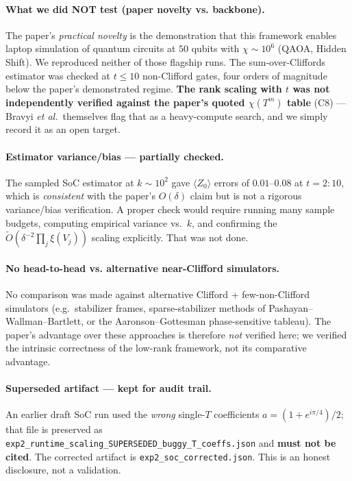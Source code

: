 \documentclass[11pt]{article}
\begin{document}
\paragraph{What we did NOT test (paper novelty vs. backbone).}
The paper's \emph{practical novelty} is the demonstration that this framework enables
laptop simulation of quantum circuits at $50$ qubits with $\chi \sim 10^6$ (QAOA,
Hidden Shift). We reproduced neither of those flagship runs. The sum-over-Cliffords
estimator was checked at $t \leq 10$ non-Clifford gates, four orders of magnitude below
the paper's demonstrated regime. \textbf{The rank scaling with $t$ was not
independently verified against the paper's quoted $\chi(T^m)$ table} (C8) --- Bravyi
\emph{et al.}\ themselves flag that as a heavy-compute search, and we simply record it
as an open target.

\paragraph{Estimator variance/bias --- partially checked.}
The sampled SoC estimator at $k \sim 10^2$ gave $\langle Z_0\rangle$ errors of $0.01$--$0.08$
at $t = 2\!:\!10$, which is \emph{consistent} with the paper's $O(\delta)$ claim but is
not a rigorous variance/bias verification. A proper check would require running many
sample budgets, computing empirical variance vs.\ $k$, and confirming the
$\tilde O(\delta^{-2} \prod_j \xi(V_j))$ scaling explicitly. That was not done.

\paragraph{No head-to-head vs. alternative near-Clifford simulators.}
No comparison was made against alternative Clifford + few-non-Clifford simulators
(e.g.\ stabilizer frames, sparse-stabilizer methods of Pashayan--Wallman--Bartlett,
or the Aaronson--Gottesman phase-sensitive tableau). The paper's advantage over these
approaches is therefore \emph{not} verified here; we verified the intrinsic correctness
of the low-rank framework, not its comparative advantage.

\paragraph{Superseded artifact --- kept for audit trail.}
An earlier draft SoC run used the \emph{wrong} single-$T$ coefficients
$a = (1 + e^{i\pi/4})/2$; that file is preserved as
\texttt{exp2\_runtime\_scaling\_SUPERSEDED\_buggy\_T\_coeffs.json} and \textbf{must not
be cited}. The corrected artifact is \texttt{exp2\_soc\_corrected.json}. This is an
honest disclosure, not a validation.
\end{document}
